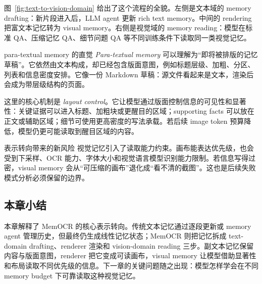 图~\ref{fig:text-to-vision-domain} 给出了这个流程的全貌。左侧是文本域的 memory drafting：新片段进入后，LLM agent 更新 rich text memory。中间的 rendering 把富文本记忆转为 visual memory。右侧是视觉域的 memory reading：模型在标准 QA、压缩记忆 QA、细节问题 QA 等不同训练条件下读取同一类视觉记忆。

\begin{knowledgebox}{para-textual memory 的直觉}
\textit{Para-textual memory} 可以理解为“即将被排版的记忆草稿”。它依然由文本构成，却已经包含版面意图，例如标题层级、加粗、分区、列表和信息密度安排。它像一份 Markdown 草稿：源文件看起来是文本，渲染后会成为带层级结构的页面。
\end{knowledgebox}

这里的核心机制是 \textit{layout control}。它让模型通过版面控制信息的可见性和显著性：关键证据可以进入标题、加粗块或更醒目的区域；supporting facts 可以放在正文或辅助区域；细节可使用更高密度的写法承载。若后续 image token 预算降低，模型仍更可能读取到醒目区域的内容。

\begin{warningbox}{表示转向带来的新风险}
视觉记忆引入了读取能力约束。画布能表达优先级，也会受到下采样、OCR 能力、字体大小和视觉语言模型识别能力限制。若信息写得过密，visual memory 会从“可压缩的画布”退化成“看不清的截图”。这也是后续失败模式分析必须保留的边界。
\end{warningbox}

\subsection{本章小结}

本章解释了 MemOCR 的核心表示转向。传统文本记忆通过逐段更新或 memory agent 管理历史，但最终仍生成线性记忆状态；MemOCR 则把记忆拆成 text-domain drafting、renderer 渲染和 vision-domain reading 三步。副文本记忆保留内容与版面意图，renderer 把它变成可读画布，visual memory 让模型借助显著性和布局读取不同优先级的信息。下一章的关键问题随之出现：模型怎样学会在不同 memory budget 下可靠读取这种视觉记忆。
